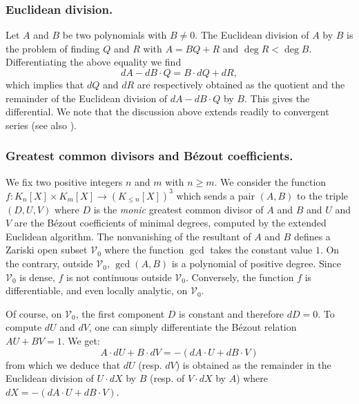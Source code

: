\documentclass{lms}
\begin{document}
\subsubsection*{Euclidean division.}

Let $A$ and $B$ be two polynomials with $B \neq 0$. The Euclidean division of 
$A$ by $B$ is the problem of finding $Q$ and $R$ with $A = BQ + R$ and $\deg R < \deg B$. 
Differentiating the above equality we find
\[
dA - dB \cdot Q = B \cdot dQ + dR,
\]
which implies that $dQ$ and $dR$ are respectively obtained as the 
quotient and the remainder of the Euclidean division of $dA - dB \cdot 
Q$ by $B$. This gives the differential. We note that the discussion 
above extends readily to convergent series (see also 
\cite{caruso-lubicz:14a}).

\subsubsection*{Greatest common divisors and B\'ezout coefficients.}

We fix two positive integers $n$ and $m$ with $n \geq m$. We consider the 
function $f : K_n[X] \times K_m[X] \to (K_{\leq n}[X])^3$ which sends a 
pair $(A,B)$ to the triple $(D, U, V)$ where $D$ is the \emph{monic} 
greatest common divisor of $A$ and $B$ and $U$ and $V$ are the B\'ezout 
coefficients of minimal degrees, computed by the extended 
Euclidean algorithm.
The nonvanishing of the resultant of $A$ and $B$ defines a Zariski open 
subset $\mathcal V_0$ where the function $\gcd$ takes the constant value 
$1$. On the contrary, outside $\mathcal V_0$, $\gcd(A,B)$ is a polynomial 
of positive degree.  Since $\mathcal V_0$ is dense, $f$ is not continuous outside 
$\mathcal V_0$. Conversely, the function $f$ is differentiable, and even locally analytic,
on $\mathcal V_0$.

Of course, on $\mathcal V_0$, the first component $D$ is constant and 
therefore $dD = 0$. To compute $dU$ and $dV$, one can simply 
differentiate the B\'ezout relation $AU + BV = 1$. We get:
$$A \cdot dU + B \cdot dV = - (dA \cdot U + dB \cdot V)$$
from which we deduce that $dU$ (resp. $dV$) is obtained as the 
remainder in the Euclidean division of $U{\cdot}dX$ by $B$ (resp. of 
$V{\cdot}dX$ by $A$) where $dX = - (dA \cdot U + dB \cdot V)$.
\end{document}
